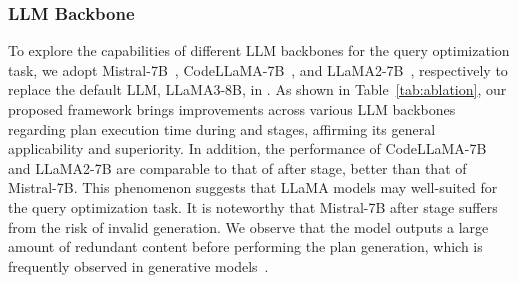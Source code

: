 \comment{

}
\subsubsection{LLM Backbone}
To explore the capabilities of different LLM backbones for the query optimization task, we adopt Mistral-7B~\cite{jiang2023mistral}, CodeLLaMA-7B~\cite{roziere2023code}, and LLaMA2-7B~\cite{touvron2023llama},  respectively to replace the default LLM, LLaMA3-8B, in \LLMQO. 
As shown in Table~\ref{tab:ablation}, our proposed framework brings improvements across various LLM backbones regarding plan execution time during \QIT and \QDPO stages, affirming its general applicability and superiority.
In addition, the performance of CodeLLaMA-7B and LLaMA2-7B are comparable to that of \LLMQO after \QDPO stage, better than that of Mistral-7B. This phenomenon suggests that LLaMA models may well-suited for the query optimization task. 
%
It is noteworthy that Mistral-7B after \QDPO stage suffers from the risk of invalid generation.
We observe that the model outputs a large amount of redundant content before performing the plan generation, which is frequently observed in generative models~\cite{DBLP:conf/iclr/HoltzmanBDFC20}.



